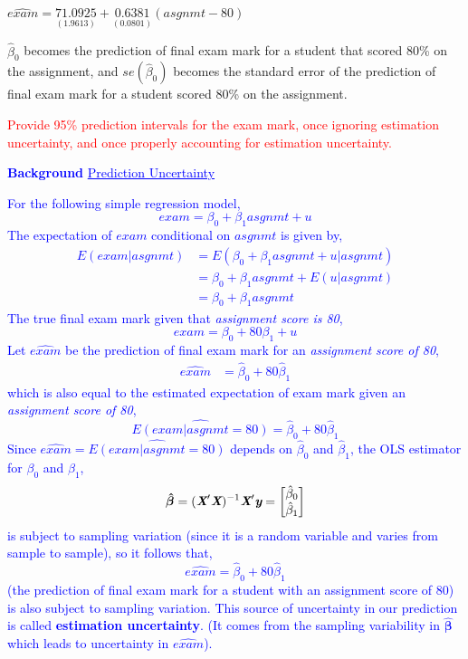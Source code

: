 \documentclass[12pt]{report}
\newenvironment{blueframed}[1][blue]
{\def\FrameCommand{\fboxsep=\FrameSep\fcolorbox{#1}{white}}%
	\MakeFramed {\advance\hsize-\width \FrameRestore}}
{\endMakeFramed}
\begin{document}
\vspace{-\baselineskip}
\centering $\widehat{exam} = \underset{(1.9613)}{71.0925} + \underset{(0.0801)}{0.6381}(asgnmt-80)$

\justify \noindent $\hat{\beta}_0$ becomes the prediction of final exam mark for a student that scored 80\% on the assignment, and $se(\hat{\beta}_0)$ becomes the standard error of the prediction of final exam mark for a student scored 80\% on the assignment.

\noindent \textcolor{red}
{
	Provide 95\% prediction intervals for the exam mark, once ignoring estimation uncertainty, and once properly accounting for estimation uncertainty.
}

\justify
\begin{blueframed}
	\textcolor{blue}{\textbf{Background}}
	\vspace{-\baselineskip}
	\justify
	\textcolor{blue}{\underline{Prediction Uncertainty}}
	
	\noindent \textcolor{blue}
	{
		For the following simple regression model, $$exam = \beta_0 + \beta_1asgnmt + u$$
		The expectation of $exam$ conditional on $asgnmt$ is given by,
		\begin{align*}
		E(exam|asgnmt) &= E(\beta_0 + \beta_1asgnmt + u|asgnmt) \\
		&= \beta_0 + \beta_1asgnmt + E(u|asgnmt) \\ 
		&= \beta_0 + \beta_1asgnmt
		\end{align*}
		The true final exam mark given that \textit{assignment score is 80},
		$$exam = \beta_0 + 80\beta_1 + u$$
		Let $\widehat{exam}$ be the prediction of final exam mark for an \textit{assignment score of 80},
		\begin{align*}
		\widehat{exam} &= \hat{\beta}_0 + 80\hat{\beta}_1 
		\end{align*}
		which is also equal to the estimated expectation of exam mark given an \textit{assignment score of 80},
		$$\widehat{E(exam|asgnmt=80)} = \hat{\beta}_0 + 80\hat{\beta}_1$$
		Since $\widehat{exam} = \widehat{E(exam|asgnmt=80)}$ depends on $\hat{\beta}_0$ and $\hat{\beta}_1$, the OLS estimator for $\beta_0$ and $\beta_1$,
		$$\boldsymbol{\hat{\beta}} = (\textit{\textbf{X}}'\textit{\textbf{X}})^{-1}\textit{\textbf{X}}'\textit{\textbf{y}} 
		= 
		\begin{bmatrix}
		\hat{\beta}_0 \\
		\hat{\beta}_1 
		\end{bmatrix} $$
		is subject to sampling variation (since it is a random variable and varies from sample to sample), so it follows that, $$\widehat{exam} = \hat{\beta}_0 + 80\hat{\beta}_1$$ (the prediction of final exam mark for a student with an assignment score of 80) is also subject to sampling variation. This source of uncertainty in our prediction is called \textbf{estimation uncertainty}. (It comes from the sampling variability in $\boldsymbol{\hat{\beta}}$ which leads to uncertainty in $\widehat{exam}$).
	}
\end{blueframed}
\end{document}
